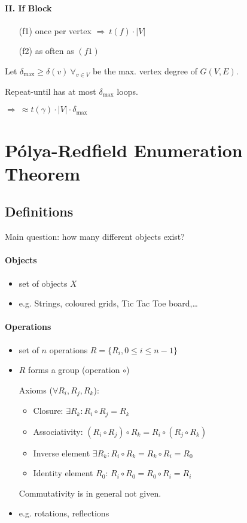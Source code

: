 \documentclass[11pt]{article}
\begin{document}
\paragraph{II. If Block}

\begin{itemize}
\item[(f1)]
	once per vertex $ \Rightarrow ~t(f ) \cdot | V | $
\item[(f2)]
	as often as $ (f1) $
\end{itemize}

Let $ \delta_{\max} \geq \delta (v) ~\forall_{v \in V} $ be the max. vertex degree of $ G (V, E) $.

Repeat-until has at most $ \delta_{\max} $ loops. \smallskip

$ \Rightarrow ~ \approx t(\gamma) \cdot | V | \cdot \delta_{\max} $


\section{Pólya-Redfield Enumeration Theorem}



\subsection{Definitions}

Main question: how many different objects exist?

\paragraph{Objects}
\begin{itemize}
\item set of objects $ X $
\item e.g. Strings, coloured grids, Tic Tac Toe board,\dots
\end{itemize}

\paragraph{Operations}

\begin{itemize}
\item set of $ n $ operations $ R = \{ R_i, 0 \leq i \leq n - 1 \} $
\item $ R $ forms a group (operation $ \circ $) \newline

	Axioms ($\forall R_i, R_j, R_k $):
	\begin{itemize}
	\item Closure: $ \exists R_k : R_i \circ R_j = R_k $
	\item Associativity: $ (R_i \circ R_j) \circ R_k = R_i \circ (R_j \circ R_k) $
	\item Inverse element $ \exists R_k: R_i \circ R_k = R_k \circ R_i = R_0 $
	\item Identity element $ R_0 $: $ R_i \circ R_0 = R_0 \circ R_i = R_i $
	\end{itemize}
	Commutativity is in general not given.
\item e.g. rotations, reflections
\end{itemize}
\end{document}
